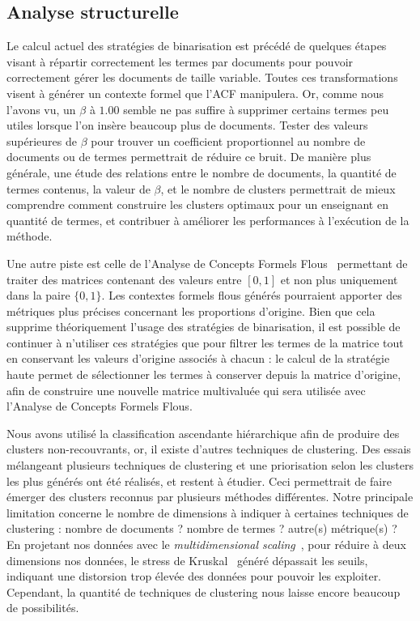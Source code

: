 \subsection{Analyse structurelle}
\label{subsection:Conclusion:PerspectivesAmeliorations:AnalyseStructurelle}

Le calcul actuel des stratégies de binarisation est précédé de quelques étapes visant à répartir correctement les termes par documents pour pouvoir correctement gérer les documents de taille variable.
Toutes ces transformations visent à générer un contexte formel que l'ACF manipulera.
Or, comme nous l'avons vu, un $ \beta $ à $ 1.00 $ semble ne pas suffire à supprimer certains termes peu utiles lorsque l'on insère beaucoup plus de documents.
Tester des valeurs supérieures de $ \beta $ pour trouver un coefficient proportionnel au nombre de documents ou de termes permettrait de réduire ce bruit.
De manière plus générale, une étude des relations entre le nombre de documents, la quantité de termes contenus, la valeur de $ \beta $, et le nombre de clusters permettrait de mieux comprendre comment construire les clusters optimaux pour un enseignant en quantité de termes, et contribuer à améliorer les performances à l'exécution de la méthode.

\bigskip

Une autre piste est celle de l'Analyse de Concepts Formels Flous~\cite{burusco1994study}\cite{poelmans2014fuzzy} permettant de traiter des matrices contenant des valeurs entre $ [ 0 , 1 ] $ et non plus uniquement dans la paire $ \{ 0, 1 \} $.
Les contextes formels flous générés pourraient apporter des métriques plus précises concernant les proportions d'origine.
Bien que cela supprime théoriquement l'usage des stratégies de binarisation, il est possible de continuer à n'utiliser ces stratégies que pour filtrer les termes de la matrice tout en conservant les valeurs d'origine associés à chacun : le calcul de la stratégie haute permet de sélectionner les termes à conserver depuis la matrice d'origine, afin de construire une nouvelle matrice multivaluée qui sera utilisée avec l'Analyse de Concepts Formels Flous.

\bigskip

Nous avons utilisé la classification ascendante hiérarchique afin de produire des clusters non-recouvrants, or, il existe d'autres techniques de clustering.
Des essais mélangeant plusieurs techniques de clustering et une priorisation selon les clusters les plus générés ont été réalisés, et restent à étudier.
Ceci permettrait de faire émerger des clusters reconnus par plusieurs méthodes différentes.
Notre principale limitation concerne le nombre de dimensions à indiquer à certaines techniques de clustering : nombre de documents ? nombre de termes ? autre(s) métrique(s) ?
En projetant nos données avec le \textit{multidimensional scaling}~\cite{kruskal1978multidimensional}\cite{young1983multidimensional}, pour réduire à deux dimensions nos données, le stress de Kruskal~\cite{kruskal1964multidimensional}\cite{wagenaar1971quantitative} généré dépassait les seuils, indiquant une distorsion trop élevée des données pour pouvoir les exploiter.
Cependant, la quantité de techniques de clustering nous laisse encore beaucoup de possibilités.

